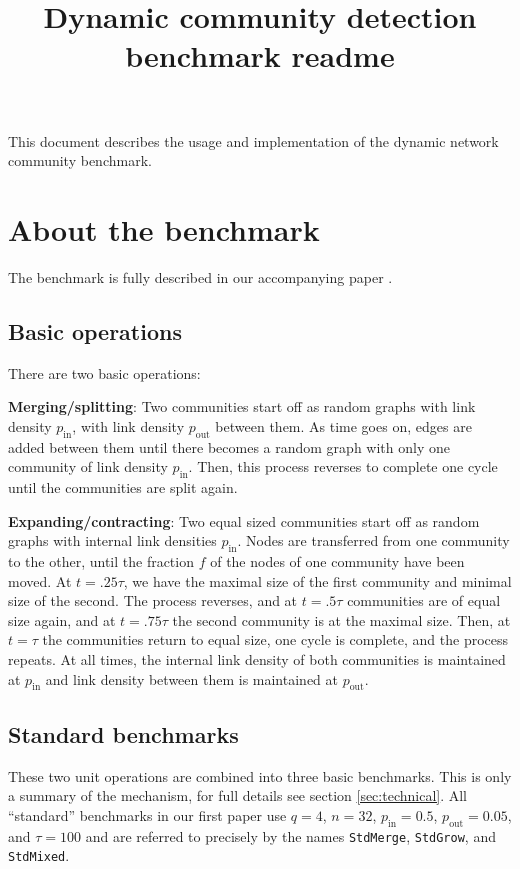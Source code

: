 \documentclass{article}
\title{Dynamic community detection benchmark readme}
\def\pin{p_\mathrm{in}}
\def\pout{p_\mathrm{out}}
\begin{document}
\maketitle

This document describes the usage and implementation of the dynamic network
community benchmark.





\section{About the benchmark}
\label{sec:about}

The benchmark is fully described in our accompanying paper \cite{xxx}.

\subsection{Basic operations}
\label{sec:about-operations}
\noindent
There are two basic operations:

\textbf{Merging/splitting}: Two communities start off as random graphs
with link density $\pin$, with link density $\pout$ between them.  As
time goes on, edges are added between them until there becomes a
random graph with only one community of link density $\pin$.  Then,
this process reverses to complete one cycle until the communities are
split again.

\textbf{Expanding/contracting}: Two equal sized communities start off
as random graphs with internal link densities $\pin$.  Nodes are
transferred from one community to the other, until the fraction $f$ of
the nodes of one community have been moved.  At $t=.25\tau$, we have
the maximal size of the first community and minimal size of the
second.  The process reverses, and at $t=.5\tau$ communities are of
equal size again, and at $t=.75\tau$ the second community is at the
maximal size.  Then, at $t=\tau$ the communities return to equal size,
one cycle is complete, and the process repeats.  At all times, the
internal link density of both communities is maintained at $\pin$ and
link density between them is maintained at $\pout$.

\subsection{Standard benchmarks}
\label{sec:about-std-benchmarks}

\noindent
These two unit operations are combined into three basic benchmarks.
This is only a summary of the mechanism, for full details see section
\ref{sec:technical}.  All ``standard'' benchmarks in our first paper
use $q=4$, $n=32$, $\pin=0.5$, $\pout=0.05$, and $\tau=100$ and are
referred to precisely by the names \texttt{StdMerge},
\texttt{StdGrow}, and \texttt{StdMixed}.
\end{document}
